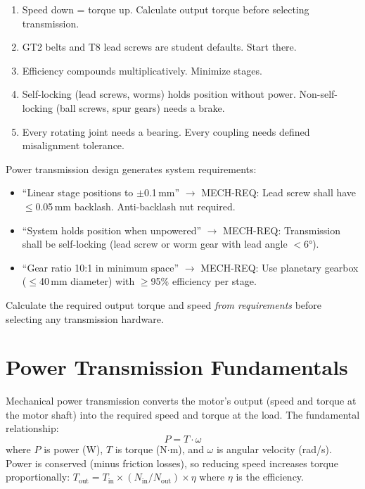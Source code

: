 \begin{keyconceptbox}
\begin{enumerate}[nosep,leftmargin=1.5em]
\item Speed down = torque up. Calculate output torque before selecting transmission.
\item GT2 belts and T8 lead screws are student defaults. Start there.
\item Efficiency compounds multiplicatively. Minimize stages.
\item Self-locking (lead screws, worms) holds position without power. Non-self-locking (ball screws, spur gears) needs a brake.
\item Every rotating joint needs a bearing. Every coupling needs defined misalignment tolerance.
\end{enumerate}
\end{keyconceptbox}


\begin{keyconceptbox}
Power transmission design generates system requirements:
\begin{itemize}[nosep,leftmargin=1.5em]
\item ``Linear stage positions to $\pm$0.1\,mm'' $\to$ MECH-REQ: Lead screw shall have $\leq$0.05\,mm backlash. Anti-backlash nut required.
\item ``System holds position when unpowered'' $\to$ MECH-REQ: Transmission shall be self-locking (lead screw or worm gear with lead angle $<$\ang{6}).
\item ``Gear ratio 10:1 in minimum space'' $\to$ MECH-REQ: Use planetary gearbox ($\leq$40\,mm diameter) with $\geq$95\% efficiency per stage.
\end{itemize}
Calculate the required output torque and speed \emph{from requirements} before selecting any transmission hardware.
\end{keyconceptbox}

\section{Power Transmission Fundamentals}
Mechanical power transmission converts the motor's output (speed and torque at the motor shaft) into the required speed and torque at the load. The fundamental relationship:
\begin{equation}
P = T \cdot \omega
\end{equation}
where $P$ is power (W), $T$ is torque (N$\cdot$m), and $\omega$ is angular velocity (rad/s). Power is conserved (minus friction losses), so reducing speed increases torque proportionally: $T_{\text{out}} = T_{\text{in}} \times (N_{\text{in}}/N_{\text{out}}) \times \eta$ where $\eta$ is the efficiency.


